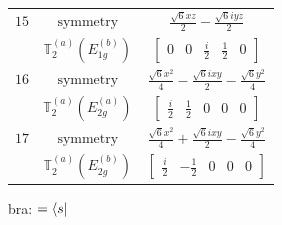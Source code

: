 \documentclass[fleqn,8pt,landscape]{jsarticle}
\begin{document}
\begin{longtable}{ccc}
$ 15 $ & $ \text{symmetry} $ & $ \frac{\sqrt{6} x z}{2} - \frac{\sqrt{6} i y z}{2} $ \\
$  $ & $ \mathbb{T}_{2}^{(a)}(E_{1g}^{(b)}) $ & $ \begin{bmatrix} 0 & 0 & \frac{i}{2} & \frac{1}{2} & 0 \end{bmatrix} $ \\ \hline
$ 16 $ & $ \text{symmetry} $ & $ \frac{\sqrt{6} x^{2}}{4} - \frac{\sqrt{6} i x y}{2} - \frac{\sqrt{6} y^{2}}{4} $ \\
$  $ & $ \mathbb{T}_{2}^{(a)}(E_{2g}^{(a)}) $ & $ \begin{bmatrix} \frac{i}{2} & \frac{1}{2} & 0 & 0 & 0 \end{bmatrix} $ \\ \hline
$ 17 $ & $ \text{symmetry} $ & $ \frac{\sqrt{6} x^{2}}{4} + \frac{\sqrt{6} i x y}{2} - \frac{\sqrt{6} y^{2}}{4} $ \\
$  $ & $ \mathbb{T}_{2}^{(a)}(E_{2g}^{(b)}) $ & $ \begin{bmatrix} \frac{i}{2} & - \frac{1}{2} & 0 & 0 & 0 \end{bmatrix} $ \\ \hline
\end{longtable}
bra: $=\bra{s}$
\end{document}
